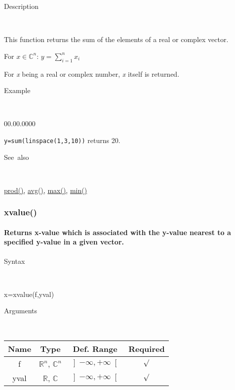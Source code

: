 \begin{description}
\item [Description]~
\end{description}
This function returns the sum of the elements of a real or complex
vector.

\medskip{}
For $x\in$$\mathbb{C}^{n}$: $y=$$\sum\limits _{i=1}^{n}x_{i}$
\medskip{}

For \textit{x} being a real or complex number, \textit{x} itself is
returned.

\begin{description}
\item [Example]~
\end{description}
\begin{lyxlist}{00.00.0000}
\item [\texttt{y=sum(linspace(1,3,10))}]returns 20.
\end{lyxlist}
\begin{description}
\item [See~also]~
\end{description}
\textcolor{blue}{\hyperlink{prod}{prod()}}\textcolor{black}{,} \textcolor{blue}{\hyperlink{avg}{avg()}}\textcolor{black}{,}
\textcolor{blue}{\hyperlink{max}{max()}}\textcolor{black}{,} \textcolor{blue}{\hyperlink{min}{min()}}


\newpage
\subsubsection*{\hypertarget{xvalue}{}{\Large xvalue()}}


\paragraph{\label{par:xvalue}Returns x-value which is associated with the y-value
nearest to a specified y-value in a given vector.}

\begin{description}
\item [Syntax]~
\end{description}
x=xvalue(f,yval)

\begin{description}
\item [Arguments]~
\end{description}
\begin{tabular}{|c|c|c|c|}
\hline 
Name&
Type&
Def. Range&
Required\tabularnewline
\hline
\hline 
f&
$\mathbb{R}^{n}$, $\mathbb{C}^{n}$&
$\left]-\infty,+\infty\right[$&
$\surd$\tabularnewline
\hline
yval&
$\mathbb{R}$, $\mathbb{C}$&
$\left]-\infty,+\infty\right[$&
$\surd$\tabularnewline
\hline
\end{tabular}

